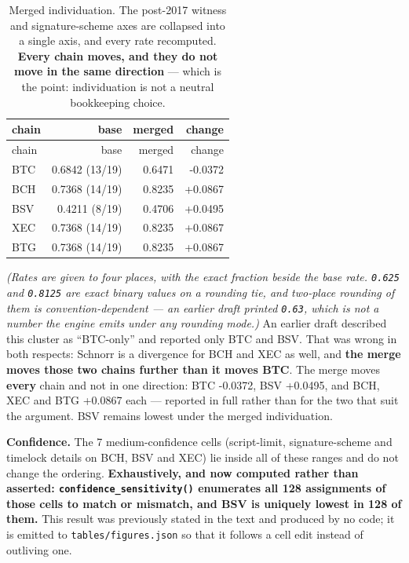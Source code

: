 \documentclass[
]{article}
\begin{document}
\begin{longtable}[]{@{}lrrr@{}}
\caption{Merged individuation. The post-2017 witness and
signature-scheme axes are collapsed into a single axis, and every rate
recomputed. \textbf{Every chain moves, and they do not move in the same
direction} --- which is the point: individuation is not a neutral
bookkeeping choice.}\tabularnewline
\toprule\noalign{}
chain & base & merged & change \\
\midrule\noalign{}
\endfirsthead
\toprule\noalign{}
chain & base & merged & change \\
\midrule\noalign{}
\endhead
\bottomrule\noalign{}
\endlastfoot
BTC & 0.6842 (13/19) & 0.6471 & -0.0372 \\
BCH & 0.7368 (14/19) & 0.8235 & +0.0867 \\
BSV & 0.4211 (8/19) & 0.4706 & +0.0495 \\
XEC & 0.7368 (14/19) & 0.8235 & +0.0867 \\
BTG & 0.7368 (14/19) & 0.8235 & +0.0867 \\
\end{longtable}

\emph{(Rates are given to four places, with the exact fraction beside
the base rate. \texttt{0.625} and \texttt{0.8125} are exact binary
values on a rounding tie, and two-place rounding of them is
convention-dependent --- an earlier draft printed \texttt{0.63}, which
is not a number the engine emits under any rounding mode.)} An earlier
draft described this cluster as ``BTC-only'' and reported only BTC and
BSV. That was wrong in both respects: Schnorr is a divergence for BCH
and XEC as well, and \textbf{the merge moves those two chains further
than it moves BTC}. The merge moves \textbf{every} chain and not in one
direction: BTC -0.0372, BSV +0.0495, and BCH, XEC and BTG +0.0867 each
--- reported in full rather than for the two that suit the argument. BSV
remains lowest under the merged individuation.

\textbf{Confidence.} The 7 medium-confidence cells (script-limit,
signature-scheme and timelock details on BCH, BSV and XEC) lie inside
all of these ranges and do not change the ordering.
\textbf{Exhaustively, and now computed rather than asserted:
\texttt{confidence\_sensitivity()} enumerates all 128 assignments of
those cells to match or mismatch, and BSV is uniquely lowest in 128 of
them.} This result was previously stated in the text and produced by no
code; it is emitted to \texttt{tables/figures.json} so that it follows a
cell edit instead of outliving one.
\end{document}
